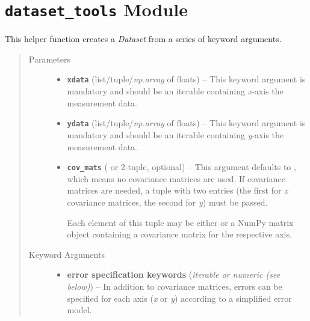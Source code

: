 \documentclass[a4paper,10pt,english]{sphinxmanual}
\begin{document}
\section{\texttt{dataset\_tools} Module}
\label{index:module-kafe.dataset_tools}\label{index:dataset-tools-module}\label{index:module-dataset_tools}

\begin{fulllineitems}
\label{index:kafe.dataset_tools.build_dataset}
This helper function creates a \emph{Dataset} from a series of keyword
arguments.
\begin{quote}\begin{description}
\item[{Parameters}] \leavevmode\begin{itemize}
\item {} 
\textbf{\texttt{xdata}} (list/tuple/\emph{np.array} of floats) -- This keyword argument is mandatory and should be an iterable
containing \emph{x}-axis the measurement data.

\item {} 
\textbf{\texttt{ydata}} (list/tuple/\emph{np.array} of floats) -- This keyword argument is mandatory and should be an iterable
containing \emph{y}-axis the measurement data.

\item {} 
\textbf{\texttt{cov\_mats}} ( or 2-tuple, optional) -- 
This argument defaults to , which means no covariance matrices
are used. If covariance matrices are needed, a tuple with two entries
(the first for \emph{x} covariance matrices, the second for \emph{y}) must be
passed.

Each element of this tuple may be either  or a NumPy matrix
object containing a covariance matrix for the respective axis.


\end{itemize}

\item[{Keyword Arguments}] \leavevmode\begin{itemize}
\item {} 
\textbf{error specification keywords} (\emph{iterable or numeric (see below)}) --
In addition to covariance matrices, errors can be specified for each
axis (\emph{x} or \emph{y}) according to a simplified error model.


\end{itemize}
\end{description}
\end{quote}
\end{fulllineitems}
\end{document}
